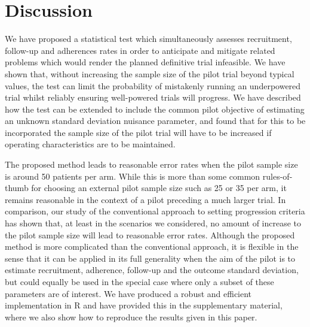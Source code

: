 \documentclass[AMA,STIX1COL]{WileyNJD-v2}
\begin{document}

\section{Discussion}\label{sec:discussion}

We have proposed a statistical test which simultaneously assesses recruitment, follow-up and adherences rates in order to anticipate and mitigate related problems which would render the planned definitive trial infeasible. We have shown that, without increasing the sample size of the pilot trial beyond typical values, the test can limit the probability of mistakenly running an underpowered trial whilst reliably ensuring well-powered trials will progress. We have described how the test can be extended to include the common pilot objective of estimating an unknown standard deviation nuisance parameter, and found that for this to be incorporated the sample size of the pilot trial will have to be increased if operating characteristics are to be maintained. 



The proposed method leads to reasonable error rates when the pilot sample size is around 50 patients per arm. While this is more than some common rules-of-thumb for choosing an external pilot sample size such as 25 \cite{Whitehead2015} or 35 \cite{Teare2014} per arm, it remains reasonable in the context of a pilot preceding a much larger trial. In comparison, our study of the conventional approach to setting progression criteria has shown that, at least in the scenarios we considered, no amount of increase to the pilot sample size will lead to reasonable error rates. Although the proposed method is more complicated than the conventional approach, it is flexible in the sense that it can be applied in its full generality when the aim of the pilot is to estimate recruitment, adherence, follow-up and the outcome standard deviation, but could equally be used in the special case where only a subset of these parameters are of interest. We have produced a robust and efficient implementation in R and have provided this in the supplementary material, where we also show how to reproduce the results given in this paper.
\end{document}
